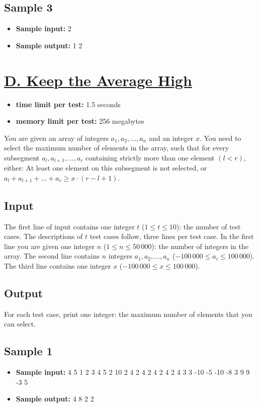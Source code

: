 \documentclass{article}
\begin{document}
\subsection*{Sample 3}
\begin{itemize}
\item \textbf{Sample input:} 
2
\item \textbf{Sample output:} 
1
2
\end{itemize}
\section{\href{https://codeforces.com/problemset/problem/1616/D}{D. Keep the Average High}}

\begin{itemize}
\item \textbf{time limit per test:} 1.5 seconds
\item \textbf{memory limit per test:} 256 megabytes
\end{itemize}
You are given an array of integers $a_1, a_2, \ldots, a_n$ and an integer $x$. You need to select the maximum number of elements in the array, such that for every subsegment $a_l, a_{l + 1}, \ldots, a_r$ containing strictly more than one element $(l < r)$, either: At least one element on this subsegment is not selected, or $a_l + a_{l+1} + \ldots + a_r \geq x \cdot (r - l + 1)$.

\subsection*{Input}
 The first line of input contains one integer $t$ ($1 \leq t \leq 10$): the number of test cases. The descriptions of $t$ test cases follow, three lines per test case. In the first line you are given one integer $n$ ($1 \leq n \leq 50\,000$): the number of integers in the array. The second line contains $n$ integers $a_1, a_2, \ldots, a_n$ ($-100\,000 \leq a_i \leq 100\,000$). The third line contains one integer $x$ ($-100\,000 \leq x \leq 100\,000$).

\subsection*{Output}
 For each test case, print one integer: the maximum number of elements that you can select.

\subsection*{Sample 1}
\begin{itemize}
\item \textbf{Sample input:} 
4
5
1 2 3 4 5
2
10
2 4 2 4 2 4 2 4 2 4
3
3
-10 -5 -10
-8
3
9 9 -3
5
\item \textbf{Sample output:} 
4
8
2
2
\end{itemize}
\end{document}
